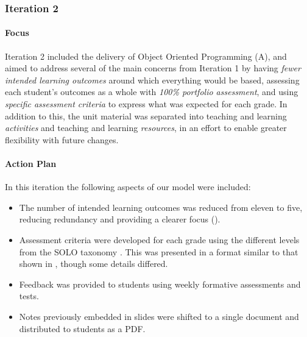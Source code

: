 
\subsubsection{Iteration 2} %
\label{sub:iteration_2}

\paragraph{Focus} %

Iteration 2 included the delivery of Object Oriented Programming (A), and aimed to address several of the main concerns from Iteration 1 by having \emph{fewer intended learning outcomes} around which everything would be based, assessing each student's outcomes as a whole with \emph{100\% portfolio assessment}, and using \emph{specific assessment criteria} to express what was expected for each grade. In addition to this, the unit material was separated into teaching and learning \emph{activities} and teaching and learning \emph{resources}, in an effort to enable greater flexibility with future changes.

\paragraph{Action Plan} %
\label{ssub:develop_an_action_plan2}

In this iteration the following aspects of our model were included:
\begin{itemize}[noitemsep,nolistsep]
  \item The number of intended learning outcomes was reduced from eleven to five, reducing redundancy and providing a clearer focus ().
  \item Assessment criteria were developed for each grade using the different levels from the SOLO taxonomy \cite{Biggs:1982}. This was presented in a format similar to that shown in , though some details differed.
  \item Feedback was provided to students using weekly formative assessments and tests.
  \item Notes previously embedded in slides were shifted to a single document and distributed to students as a PDF.
\end{itemize}

